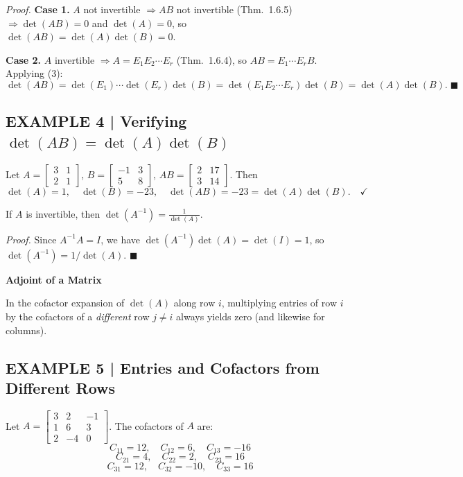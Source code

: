 \documentclass{article}
\newcommand{\redheading}[1]{{\vspace{2mm}\noindent\Large\bfseries\color{red!55!black} #1\par}\vspace{2mm}}
\theoremstyle{mystyle}
\begin{document}
\textit{Proof.}
\textbf{Case 1.} $A$ not invertible $\Rightarrow AB$ not invertible (Thm.\ 1.6.5)
$\Rightarrow \det(AB)=0$ and $\det(A)=0$, so $\det(AB)=\det(A)\det(B)=0$.

\textbf{Case 2.} $A$ invertible $\Rightarrow A=E_1 E_2\cdots E_r$ (Thm.\ 1.6.4), so
$AB=E_1\cdots E_r B$. Applying (3):
\[
\det(AB)=\det(E_1)\cdots\det(E_r)\det(B)=\det(E_1 E_2\cdots E_r)\det(B)=\det(A)\det(B). \;\blacksquare
\]

\subsection*{EXAMPLE 4 | Verifying $\det(AB)=\det(A)\det(B)$}

Let $A=\begin{bmatrix}3&1\\2&1\end{bmatrix}$, $B=\begin{bmatrix}-1&3\\5&8\end{bmatrix}$,
$AB=\begin{bmatrix}2&17\\3&14\end{bmatrix}$. Then
\[
\det(A)=1,\quad\det(B)=-23,\quad\det(AB)=-23=\det(A)\det(B).\quad\checkmark
\]

\begin{tcolorbox}[colback=red!4, colframe=red!60!black,
  title={\textbf{Theorem 2.3.5}}, boxrule=0.5mm, arc=3mm]
If $A$ is invertible, then $\displaystyle\det(A^{-1})=\frac{1}{\det(A)}$.
\end{tcolorbox}

\textit{Proof.} Since $A^{-1}A=I$, we have $\det(A^{-1})\det(A)=\det(I)=1$, so
$\det(A^{-1})=1/\det(A)$. $\blacksquare$

\redheading{Adjoint of a Matrix}

In the cofactor expansion of $\det(A)$ along row $i$, multiplying entries of row $i$
by the cofactors of a \emph{different} row $j\neq i$ always yields zero (and likewise
for columns).

\subsection*{EXAMPLE 5 | Entries and Cofactors from Different Rows}

Let $A=\begin{bmatrix}3&2&-1\\1&6&3\\2&-4&0\end{bmatrix}$.
The cofactors of $A$ are:
\[
C_{11}=12,\quad C_{12}=6,\quad C_{13}=-16
\]
\[
C_{21}=4,\quad C_{22}=2,\quad C_{23}=16
\]
\[
C_{31}=12,\quad C_{32}=-10,\quad C_{33}=16
\]
\end{document}
